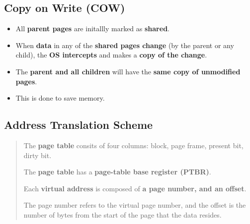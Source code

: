 \documentclass{article}
\begin{document}
    \subsection*{Copy on Write (COW)}
    \begin{itemize}
        \item All \textbf{parent pages} are initallly marked as \textbf{shared}.
        \item When \textbf{data} in any of the \textbf{shared pages change} (by the parent or any child), the \textbf{OS intercepts} and makes a \textbf{copy of the change}.
        \item The \textbf{parent and all children} will have the \textbf{same copy of unmodified pages}.
        \item This is done to save memory.
    \end{itemize}

    \subsection*{Address Translation Scheme}
    \begin{abstract}
        \item The \textbf{page table} consits of four columns: block, page frame, present bit, dirty bit.
        \item The \textbf{page table} has a \textbf{page-table base register (PTBR)}.
        \item Each \textbf{virtual address} is composed of \textbf{a page number, and an offset}.
        \item The page number refers to the virtual page number, and the offset is the number of bytes from the start of the page that the data resides.
    \end{abstract}
\end{document}
